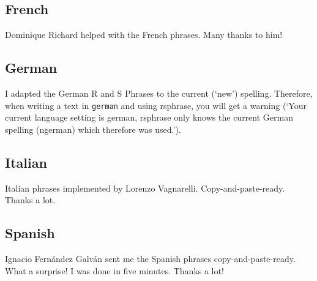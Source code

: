 \documentclass[a4paper,notitlepage]{scrreprt}
\begin{document}
\subsection{French}
Dominique Richard helped with the French phrases. Many thanks to him! 
\allrsphrases
{}

\subsection{German}
I adapted the German R and S Phrases to the current (`new') spelling. Therefore, when writing a text in \verb|german| and using rsphrase, you will get a warning (`Your current language setting is german, rsphrase only knows the current German spelling (ngerman) which therefore was used.').
\allrsphrases
{}

\subsection{Italian}
Italian phrases implemented by Lorenzo Vagnarelli. Copy-and-paste-ready. Thanks a lot.
\allrsphrases[alt42]

\subsection{Spanish}
Ignacio Fernández Galván sent me the Spanish phrases copy-and-paste-ready. What a surprise! I was done in five minutes. Thanks a lot!
\allrsphrases[alt42]
\end{document}
